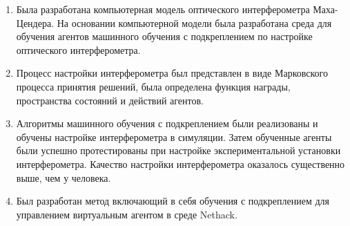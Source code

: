 \begin{enumerate}
  \item Была разработана компьютерная модель оптического интерферометра Маха-Цендера. На основании компьютерной модели была разработана среда для обучения агентов машинного обучения с подкреплением по настройке оптического интерферометра. 
  \item Процесс настройки интерферометра был представлен в виде Марковского процесса принятия решений, была определена функция награды, пространства состояний и действий агентов. 
  \item Алгоритмы машинного обучения с подкреплением были реализованы и обучены настройке интерферометра в симуляции. Затем обученные агенты были успешно протестированы при настройке экспериментальной установки интерферометра. Качество настройки интерферометра оказалось существенно выше, чем у человека. 
  \item Был разработан метод включающий в себя обучения с подкреплением для управлением виртуальным агентом в среде Nethack. 
\end{enumerate}

\newpage

